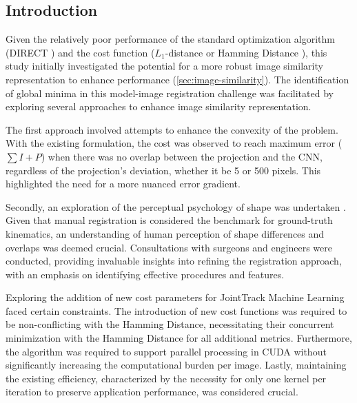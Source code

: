 \subsection{Introduction}
Given the relatively poor performance of the standard optimization algorithm (DIRECT \cite{jonesLipschitzianOptimizationLipschitz1993,floodAutomatedRegistration3D2018}) and the cost function ($L_{1}$-distance or Hamming Distance \cite{floodAutomatedRegistration3D2018}), this study initially investigated the potential for a more robust image similarity representation to enhance performance (\cref{sec:image-similarity}).
The identification of global minima in this model-image registration challenge was facilitated by exploring several approaches to enhance image similarity representation.

The first approach involved attempts to enhance the convexity of the problem.
With the existing formulation, the cost was observed to reach maximum error ($\sum I + P$) when there was no overlap between the projection and the CNN, regardless of the projection's deviation, whether it be 5 or 500 pixels.
This highlighted the need for a more nuanced error gradient.

Secondly, an exploration of the perceptual psychology of shape was undertaken \cite{attneaveInformationalAspectsVisual1954,attneaveQuantitativeStudyShape1956}.
Given that manual registration is considered the benchmark for ground-truth kinematics, an understanding of human perception of shape differences and overlaps was deemed crucial.
Consultations with surgeons and engineers were conducted, providing invaluable insights into refining the registration approach, with an emphasis on identifying effective procedures and features.

Exploring the addition of new cost parameters for JointTrack Machine Learning faced certain constraints.
The introduction of new cost functions was required to be non-conflicting with the Hamming Distance, necessitating their concurrent minimization with the Hamming Distance for all additional metrics.
Furthermore, the algorithm was required to support parallel processing in CUDA without significantly increasing the computational burden per image.
Lastly, maintaining the existing efficiency, characterized by the necessity for only one kernel per iteration to preserve application performance, was considered crucial.




